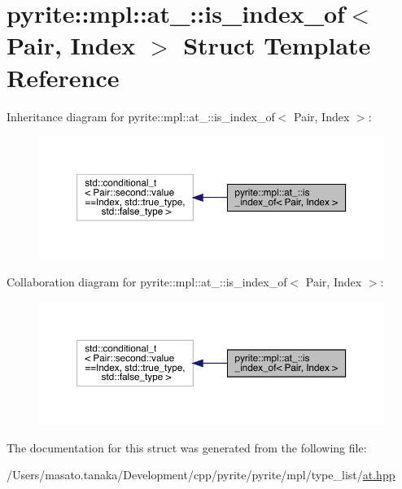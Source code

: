 \hypertarget{structpyrite_1_1mpl_1_1at___1_1is__index__of}{}\section{pyrite\+:\+:mpl\+:\+:at\+\_\+\+:\+:is\+\_\+index\+\_\+of$<$ Pair, Index $>$ Struct Template Reference}
\label{structpyrite_1_1mpl_1_1at___1_1is__index__of}


Inheritance diagram for pyrite\+:\+:mpl\+:\+:at\+\_\+\+:\+:is\+\_\+index\+\_\+of$<$ Pair, Index $>$\+:
\nopagebreak
\begin{figure}[H]
\begin{center}
\leavevmode
\includegraphics[width=350pt]{dd/d8e/structpyrite_1_1mpl_1_1at___1_1is__index__of__inherit__graph}
\end{center}
\end{figure}


Collaboration diagram for pyrite\+:\+:mpl\+:\+:at\+\_\+\+:\+:is\+\_\+index\+\_\+of$<$ Pair, Index $>$\+:
\nopagebreak
\begin{figure}[H]
\begin{center}
\leavevmode
\includegraphics[width=350pt]{db/d7d/structpyrite_1_1mpl_1_1at___1_1is__index__of__coll__graph}
\end{center}
\end{figure}


The documentation for this struct was generated from the following file\+:\begin{DoxyCompactItemize}
\item 
/\+Users/masato.\+tanaka/\+Development/cpp/pyrite/pyrite/mpl/type\+\_\+list/\mbox{\hyperlink{at_8hpp}{at.\+hpp}}\end{DoxyCompactItemize}
